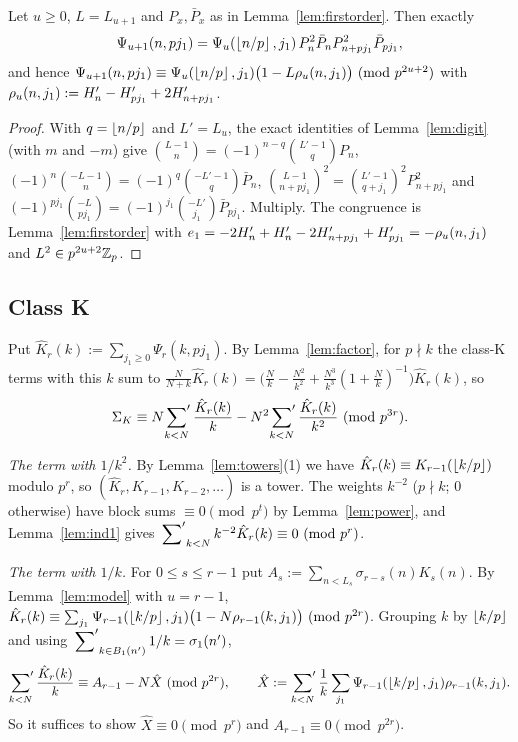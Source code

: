 \documentclass[11pt]{amsart}
\begin{document}
\begin{lemma}\label{lem:model}
Let $u\ge0$, $L=L_{u+1}$ and $P_x,\bar P_x$ as in Lemma~\ref{lem:firstorder}. Then exactly
\[ \Psi_{u+1}(n,pj_1)=\Psi_u(\left\lfloor n/p\right\rfloor,j_1)\,P_n^2\bar P_nP_{n+pj_1}^2\bar P_{pj_1}, \]
and hence $\Psi_{u+1}(n,pj_1)\equiv\Psi_u(\left\lfloor n/p\right\rfloor,j_1)\bigl(1-L\rho_u(n,j_1)\bigr)\ (\mathrm{mod}\ p^{2u+2})$ with $\rho_u(n,j_1):=H'_n-H'_{pj_1}+2H'_{n+pj_1}$.
\end{lemma}
\begin{proof}
With $q=\left\lfloor n/p\right\rfloor$ and $L'=L_u$, the exact identities of Lemma~\ref{lem:digit} (with $m$ and $-m$) give $\binom{L-1}n=(-1)^{n-q}\binom{L'-1}qP_n$, $(-1)^n\binom{-L-1}n=(-1)^q\binom{-L'-1}q\bar P_n$, $\binom{L-1}{n+pj_1}^2=\binom{L'-1}{q+j_1}^2P_{n+pj_1}^2$ and $(-1)^{pj_1}\binom{-L}{pj_1}=(-1)^{j_1}\binom{-L'}{j_1}\bar P_{pj_1}$. Multiply. The congruence is Lemma~\ref{lem:firstorder} with $e_1=-2H'_n+H'_n-2H'_{n+pj_1}+H'_{pj_1}=-\rho_u(n,j_1)$ and $L^2\in p^{2u+2}\mathbb{Z}_{p}$.
\end{proof}

\subsection{Class K}
Put $\hat K_r(k):=\sum_{j_1\ge0}\Psi_r(k,pj_1)$. By Lemma~\ref{lem:factor}, for $p\nmid k$ the class-K terms with this $k$ sum to $\frac N{N+k}\hat K_r(k)=\bigl(\frac Nk-\frac{N^2}{k^2}+\frac{N^3}{k^3}(1+\frac Nk)^{-1}\bigr)\hat K_r(k)$, so
\begin{equation}\label{eq:K1}
\Sigma_K\equiv N\sideset{}{'}\sum_{k<N}\frac{\hat K_r(k)}k-N^2\sideset{}{'}\sum_{k<N}\frac{\hat K_r(k)}{k^2}\ (\mathrm{mod}\ p^{3r}).
\end{equation}

\emph{The term with $1/k^2$.} By Lemma~\ref{lem:towers}(1) we have $\hat K_r(k)\equiv K_{r-1}(\left\lfloor k/p\right\rfloor)$ modulo $p^r$, so $(\hat K_r,K_{r-1},K_{r-2},\dots)$ is a tower. The weights $k^{-2}$ ($p\nmid k$; $0$ otherwise) have block sums $\equiv0\pmod{p^t}$ by Lemma~\ref{lem:power}, and Lemma~\ref{lem:ind1} gives $\sideset{}{'}\sum_{k<N}k^{-2}\hat K_r(k)\equiv0\ (\mathrm{mod}\ p^r)$.

\emph{The term with $1/k$.} For $0\le s\le r-1$ put $A_s:=\sum_{n<L_s}\sigma_{r-s}(n)K_s(n)$. By Lemma~\ref{lem:model} with $u=r-1$, $\hat K_r(k)\equiv\sum_{j_1}\Psi_{r-1}(\left\lfloor k/p\right\rfloor,j_1)\bigl(1-N\rho_{r-1}(k,j_1)\bigr)\ (\mathrm{mod}\ p^{2r})$. Grouping $k$ by $\left\lfloor k/p\right\rfloor$ and using $\sideset{}{'}\sum_{k\in B_1(n')}1/k=\sigma_1(n')$,
\[ \sideset{}{'}\sum_{k<N}\frac{\hat K_r(k)}k\equiv A_{r-1}-N\hat X\ (\mathrm{mod}\ p^{2r}),\qquad\hat X:=\sideset{}{'}\sum_{k<N}\frac1k\sum_{j_1}\Psi_{r-1}(\left\lfloor k/p\right\rfloor,j_1)\rho_{r-1}(k,j_1). \]
So it suffices to show $\hat X\equiv0\pmod{p^r}$ and $A_{r-1}\equiv0\pmod{p^{2r}}$.
\end{document}
